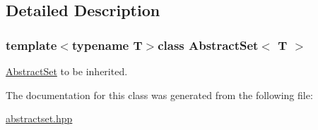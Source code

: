 \subsection{Detailed Description}
\subsubsection*{template$<$typename T$>$class Abstract\-Set$<$ T $>$}

\hyperlink{class_abstract_set}{Abstract\-Set} to be inherited. 

The documentation for this class was generated from the following file\-:\begin{DoxyCompactItemize}
\item 
\hyperlink{abstractset_8hpp}{abstractset.\-hpp}\end{DoxyCompactItemize}

